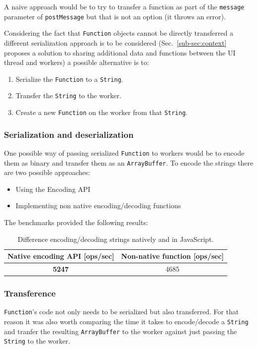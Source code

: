 \documentclass[runningheads,a4paper]{llncs}
\begin{document}
A naive approach would be to try to transfer a function as part of the \verb+message+ parameter of \verb+postMessage+ but that is not an option (it throws an error).

Considering the fact that \verb+Function+ objects cannot be directly transferred a different serialization approach is to be considered (Sec.~\ref{sub-sec:context} proposes a solution to sharing additional data and functions between the UI thread and workers) a possible alternative is to:
\begin{enumerate}
  \item Serialize the \verb+Function+ to a \verb+String+.
  \item Transfer the \verb+String+ to the worker.
  \item Create a new \verb+Function+ on the worker from that \verb+String+.
\end{enumerate}

\subsubsection{Serialization and deserialization}
One possible way of passing serialized \verb+Function+ to workers would be to encode them as binary and transfer them as an \verb+ArrayBuffer+. To encode the strings there are two possible approaches:
\begin{itemize}
  \item Using the Encoding API\cite{encoding-api}
  \item Implementing non native encoding/decoding functions
\end{itemize}

The benchmarks provided the following results:
\begin{table}
  \centering
  \begin{tabular}{|c|c|}
    \hline
    Native encoding API [ops/sec] & Non-native function [ops/sec] \\
    \hline
    \textbf{5247} & 4685 \\
    \hline
  \end{tabular}
  \caption{Difference encoding/decoding strings natively and in JavaScript.}
  \label{tab:encode-decode}
\end{table}

\subsubsection{Transference}
\verb+Function+'s code not only needs to be serialized but also transferred. For that reason it was also worth comparing the time it takes to encode/decode a \verb+String+ and tranfer the resulting \verb+ArrayBuffer+ to the worker against just passing the \verb+String+ to the worker.
\end{document}

